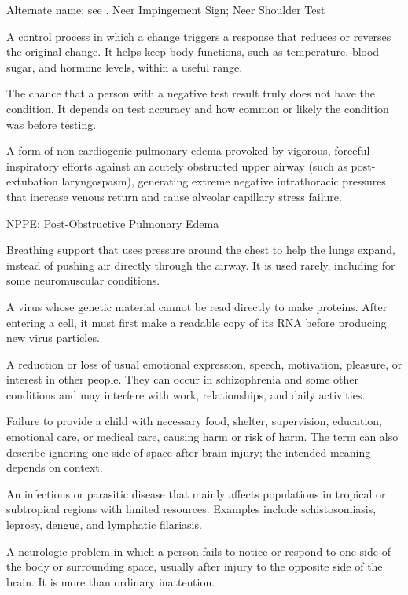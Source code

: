  Alternate name; see .
\synonyms
Neer Impingement Sign; Neer Shoulder Test

 A control process in which a change triggers a response that reduces or reverses the original change. It helps keep body functions, such as temperature, blood sugar, and hormone levels, within a useful range.

 The chance that a person with a negative test result truly does not have the condition. It depends on test accuracy and how common or likely the condition was before testing.

 A form of non-cardiogenic pulmonary edema provoked by vigorous, forceful inspiratory efforts against an acutely obstructed upper airway (such as post-extubation laryngospasm), generating extreme negative intrathoracic pressures that increase venous return and cause alveolar capillary stress failure.

\synonyms
NPPE; Post-Obstructive Pulmonary Edema

 Breathing support that uses pressure around the chest to help the lungs expand, instead of pushing air directly through the airway. It is used rarely, including for some neuromuscular conditions.

 A virus whose genetic material cannot be read directly to make proteins. After entering a cell, it must first make a readable copy of its RNA before producing new virus particles.

 A reduction or loss of usual emotional expression, speech, motivation, pleasure, or interest in other people. They can occur in schizophrenia and some other conditions and may interfere with work, relationships, and daily activities.

 Failure to provide a child with necessary food, shelter, supervision, education, emotional care, or medical care, causing harm or risk of harm. The term can also describe ignoring one side of space after brain injury; the intended meaning depends on context.

 An infectious or parasitic disease that mainly affects populations in tropical or subtropical regions with limited resources. Examples include schistosomiasis, leprosy, dengue, and lymphatic filariasis.

 A neurologic problem in which a person fails to notice or respond to one side of the body or surrounding space, usually after injury to the opposite side of the brain. It is more than ordinary inattention.


